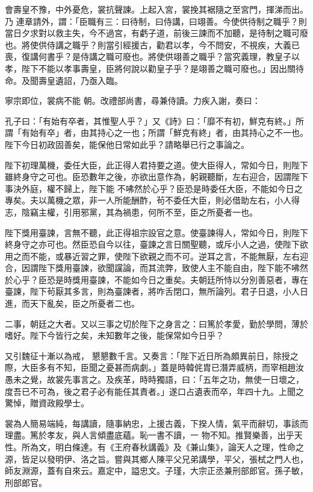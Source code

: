 \begin{pinyinscope}
 會壽皇不豫，中外憂危，裳抗聲諫。上起入宮，裳挽其裾隨之至宮門，揮涕而出。乃
 連章請外，謂：「臣職有三：曰待制，曰侍講，曰翊善。今使供待制之職乎？則當日夕求對以救主失，今不過宮，有虧子道，前後三諫而不加聽，是待制之職可廢也。將使供侍講之職乎？則當引經援古，勸君以孝，今不問安，不視疾，大義已喪，復講何書乎？是侍講之職可廢也。將使供翊善之職乎？當究義理，教皇子以孝，陛下不能以孝事壽皇，臣將何說以勸皇子乎？是翊善之職可廢也。」因出關待命。及聞壽皇遺詔，乃亟入臨。



 寧宗即位，裳病不能
 朝。改禮部尚書，尋兼侍讀。力疾入謝，奏曰：



 孔子曰：「有始有卒者，其惟聖人乎？」又《詩》曰：「靡不有初，鮮克有終。」所謂「有始有卒」者，由其持心之一也；所謂「鮮克有終」者，由其持心之不一也。陛下今日初政固善矣，能保他日常如此乎？請略舉已行之事論之。



 陛下初理萬機，委任大臣，此正得人君持要之道。使大臣得人，常如今日，則陛下雖終身守之可也。臣恐數年之後，亦欲出意作為，躬親聽斷，左右迎合，因謂陛下事決外庭，權不歸上，陛下能
 不咈然於心乎？臣恐是時委任大臣，不能如今日之專矣。夫以萬機之眾，非一人所能酬酢，茍不委任大臣，則必借助左右，小人得志，陰竊主權，引用邪黨，其為禍患，何所不至，臣之所憂者一也。



 陛下獎用臺諫，言無不聽，此正得祖宗設官之意。使臺諫得人，常如今日，則陛下終身守之亦可也。然臣恐自今以往，臺諫之言日關聖聽，或斥小人之過，使陛下欲用之而不能，或暴近習之罪，使陛下欲親之而不可。逆耳之言，不能無厭，左右迎
 合，因謂陛下獎用臺諫，欲聞讜論，而其流弊，致使人主不能自由，陛下能不咈然於心乎？臣恐是時獎用臺諫，不能如今日之重矣。夫朝廷所恃以分別善惡者，專在臺諫，陛下茍厭其多言，則為臺諫者，將咋舌閉口，無所論列。君子日退，小人日進，而天下亂矣，臣之所憂者二也。



 二事，朝廷之大者。又以三事之切於陛下之身言之：曰篤於孝愛，勤於學問，薄於嗜好。陛下今皆行之矣，未知數年之後，能保常如今日乎？



 又引魏征十漸以為戒，
 懇懇數千言。又奏言：「陛下近日所為頗異前日，除授之際，大臣多有不知，臣聞之憂甚而病劇。」蓋是時韓侂胄已潛弄威柄，而宰相趙汝愚未之覺，故裳先事言之。及疾革，時時獨語，曰：「五年之功，無使一日壞之，度吾已不可為，後之君子必有能任其責者。」遂口占遺表而卒，年四十九。上聞之驚悼，贈資政殿學士。



 裳為人簡易端純，每講讀，隨事納忠，上援古義，下揆人情，氣平而辭切，事該而理盡。篤於孝友，與人言傾盡底蘊。恥一書不讀，一
 物不知。推賢樂善，出乎天性。所為文，明白條達。有《王府春秋講義》及《兼山集》，論天人之理，性命之源，皆足以發明伊、洛之旨。嘗與其鄉人陳平父兄弟講學，平父，張栻之門人也，師友淵源，蓋有自來云。嘉定中，謚忠文。子瑾，大宗正丞兼刑部郎官。孫子敏，刑部郎官。




\end{pinyinscope}
